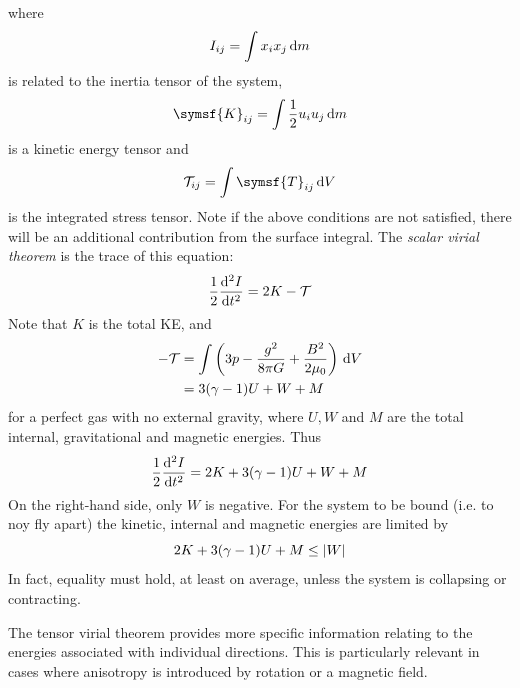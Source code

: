 \documentclass{jknotes}
\begin{document}
where 
\begin{equation}
	I_{ij} = \int x_i x_j \, \diffd m
\end{equation}
is related to the inertia tensor of the system, 
\begin{equation}
	\symsf{K}_{ij} = \int \frac{1}{2}u_i u_j \, \diffd m
\end{equation}
is a kinetic energy tensor and 
\begin{equation}
	\mathcal{T}_{ij} = \int \symsf{T}_{ij} \, \diffd V
\end{equation}
is the integrated stress tensor. Note if the above conditions are not
satisfied, there will be an additional contribution from the surface
integral. The \emph{scalar virial theorem} is the trace of this equation:
\begin{equation}
	\frac{1}{2}\frac{\diffd^2 I}{\diffd t^2} = 2K - \mathcal{T}
\end{equation}
Note that $K$ is the total KE, and
\begin{align}
	-\mathcal{T} &= \int \left( 3p - \frac{g^2}{8\pi G} + \frac{B^2}{2\mu_0}
	\right) \, \diffd V \\
				 &= 3 (\gamma -1 ) U + W + M
\end{align}
for a perfect gas with no external gravity, where $U, W$ and $M$ are the total
internal, gravitational and magnetic energies. Thus
\begin{equation}
	\frac{1}{2}\frac{\diffd^2 I}{\diffd t^2} = 2K + 3(\gamma - 1) U + W + M
\end{equation}
On the right-hand side, only $W$ is negative. For the system to be bound (i.e.
to noy fly apart) the kinetic, internal and magnetic energies are limited by
\begin{equation}
	2K + 3(\gamma -1 )U + M \le \abs{W}
\end{equation}
In fact, equality must hold, at least on average, unless the system is
collapsing or contracting.

The tensor virial theorem provides more specific information relating to the
energies associated with individual directions. This is particularly relevant
in cases where anisotropy is introduced by rotation or a magnetic field.
\end{document}
